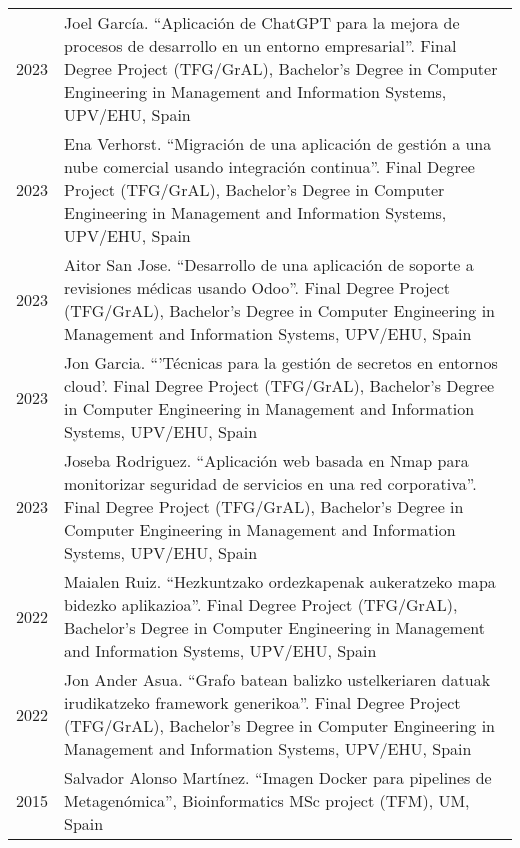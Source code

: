 \documentclass[11pt,fullpage]{article}
\begin{document}
\begin{longtable}{p{0.5in}|p{5.5in}}
2023 & Joel García. ``Aplicación de ChatGPT para la mejora de procesos de desarrollo en un entorno empresarial''. Final Degree Project (TFG/GrAL), Bachelor's Degree in Computer Engineering in Management and Information Systems, UPV/EHU, Spain \\
2023 & Ena Verhorst. ``Migración de una aplicación de gestión a una nube comercial usando integración continua''. Final Degree Project (TFG/GrAL), Bachelor's Degree in Computer Engineering in Management and Information Systems, UPV/EHU, Spain \\
2023 & Aitor San Jose. ``Desarrollo de una aplicación de soporte a revisiones médicas usando Odoo''. Final Degree Project (TFG/GrAL), Bachelor's Degree in Computer Engineering in Management and Information Systems, UPV/EHU, Spain \\
2023 & Jon Garcia. ``'Técnicas para la gestión de secretos en entornos cloud'. Final Degree Project (TFG/GrAL), Bachelor's Degree in Computer Engineering in Management and Information Systems, UPV/EHU, Spain \\
2023 & Joseba Rodriguez. ``Aplicación web basada en Nmap para monitorizar seguridad de servicios en una red corporativa''. Final Degree Project (TFG/GrAL), Bachelor's Degree in Computer Engineering in Management and Information Systems, UPV/EHU, Spain \\
2022 & Maialen Ruiz. ``Hezkuntzako ordezkapenak aukeratzeko mapa bidezko aplikazioa''. Final Degree Project (TFG/GrAL), Bachelor's Degree in Computer Engineering in Management and Information Systems, UPV/EHU, Spain \\
2022 & Jon Ander Asua. ``Grafo batean balizko ustelkeriaren datuak irudikatzeko framework generikoa''. Final Degree Project (TFG/GrAL), Bachelor's Degree in Computer Engineering in Management and Information Systems, UPV/EHU, Spain \\
2015 & Salvador Alonso Mart\'inez. ``Imagen Docker para pipelines de Metagen\'omica'', Bioinformatics MSc project (TFM), UM, Spain \\

\end{longtable}
\end{document}
